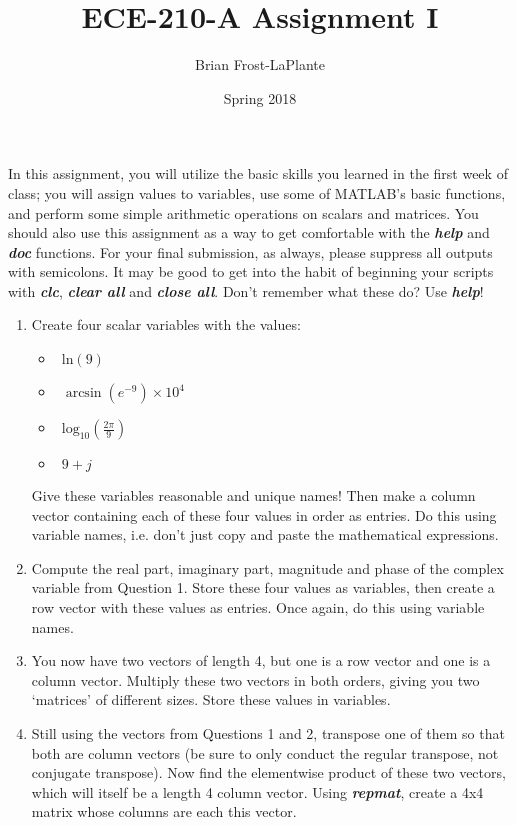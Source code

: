 \documentclass{article}
\title{ECE-210-A Assignment I}
\author{Brian Frost-LaPlante}
\date{Spring 2018}
\begin{document}
\maketitle
\noindent In this assignment, you will utilize the basic skills you learned in the first week of class; you will assign values to variables, use some of MATLAB's basic functions, and perform some simple arithmetic operations on scalars and matrices. You should also use this assignment as a way to get comfortable with the \textit{\textbf{help}} and \textit{\textbf{doc}} functions. For your final submission, as always, please suppress all outputs with semicolons. It may be good to get into the habit of beginning your scripts with \textit{\textbf{clc}}, \textit{\textbf{clear all}} and \textit{\textbf{close all}}. Don't remember what these do? Use \textit{\textbf{help}}! 
\begin{enumerate}[leftmargin=0cm,itemindent=.5cm,labelwidth=\itemindent,labelsep=0cm,align=left,label=\textbf{\arabic*.}]
\item Create four scalar variables with the values:
	\begin{itemize}
		\item $\:\:\text{ln}(9)$
		\item $\:\:\arcsin(e^{-9})\times10^4$
		\item $\:\:\text{log}_{10}(\frac{2\pi}{9})$
		\item $\:\: 9 + j$
	\end{itemize}
	Give these variables reasonable and unique names! Then make a column vector containing each of these four values in order as entries. Do this using variable names, i.e. don't just copy and paste the mathematical expressions.
\item Compute the real part, imaginary part, magnitude and phase of the complex variable from Question 1. Store these four values as variables, then create a row vector with these values as entries. Once again, do this using variable names.
\item You now have two vectors of length 4, but one is a row vector and one is a column vector. Multiply these two vectors in both orders, giving you two `matrices' of different sizes. Store these values in variables. 
\item Still using the vectors from Questions 1 and 2, transpose one of them so that both are column vectors (be sure to only conduct the regular transpose, not conjugate transpose). Now find the elementwise product of these two vectors, which will itself be a length 4 column vector. Using \textit{\textbf{repmat}}, create a 4x4 matrix whose columns are each this vector. 

\end{enumerate}
\end{document}
